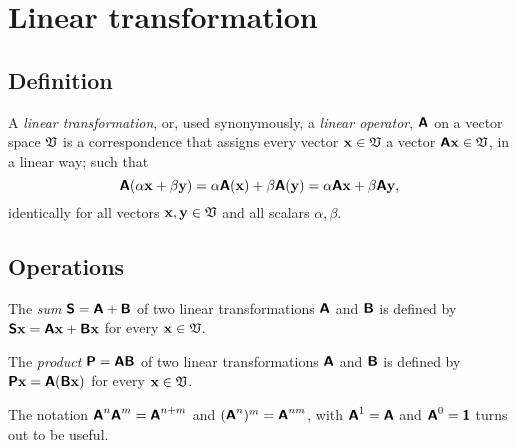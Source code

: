 \section{Linear transformation}

\subsection{Definition}
A {\em linear transformation}, or, used synonymously, a {\em linear operator},
$\textsf{\textbf{A}} $ on a vector space ${\frak V}$ is a correspondence that assigns every vector
${\bf x}\in {\frak V}$ a vector $\textsf{\textbf{A}} {\bf x}\in {\frak V}$,
in a linear way; such  that
\begin{equation}
\textsf{\textbf{A}}  (\alpha {\bf x}+ \beta {\bf y}) = \alpha \textsf{\textbf{A}}({\bf x})
+  \beta \textsf{\textbf{A}} ({\bf y}) = \alpha \textsf{\textbf{A}}{\bf x}
+  \beta \textsf{\textbf{A}} {\bf y},
\end{equation}
identically for all vectors ${\bf x},{\bf y}\in {\frak V}$ and all scalars $\alpha , \beta$.


\subsection{Operations}
The {\em sum}
$\textsf{\textbf{S}} =\textsf{\textbf{A}} +\textsf{\textbf{B}} $
of two linear transformations $\textsf{\textbf{A}}$ and $\textsf{\textbf{B}} $
is defined by
$\textsf{\textbf{S}} {\bf x}=\textsf{\textbf{A}}{\bf x} +\textsf{\textbf{B}} {\bf x}$
for every ${\bf x}\in {\frak V}$.

The {\em product}
$\textsf{\textbf{P}} =\textsf{\textbf{A}} \textsf{\textbf{B}} $
of two linear transformations $\textsf{\textbf{A}}$ and $\textsf{\textbf{B}} $
is defined by
$\textsf{\textbf{P}} {\bf x}=\textsf{\textbf{A}}(\textsf{\textbf{B}} {\bf x})$
for every ${\bf x}\in {\frak V}$.

The notation
$\textsf{\textbf{A}}^n\textsf{\textbf{A}}^m=\textsf{\textbf{A}}^{n+m}$
and $(\textsf{\textbf{A}}^n)^m= \textsf{\textbf{A}}^{nm}$,
with $\textsf{\textbf{A}}^1=\textsf{\textbf{A}}$ and
$\textsf{\textbf{A}}^0 =\textsf{\textbf{1}}$ turns out to be useful.

